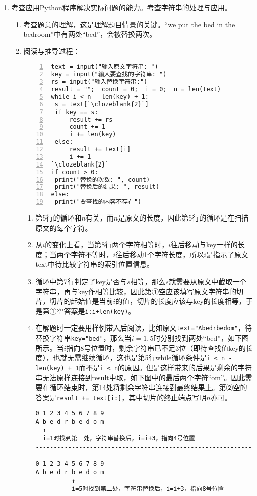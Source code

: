 \begin{enumerate}
\item 考查应用Python程序解决实际问题的能力。考查字符串的处理与应用。
	\begin{enumerate}[label=$(\arabic*)$]
	\item 考查题意的理解，这是理解题目情景的关键。“we put the bed in the bedroom”中有两处“bed”，会被替换两次。	
	\item 阅读与推导过程：
\setcounter{qnumber}{1}
\begin{lstlisting}[numbers=left]
text = input("输入原文字符串: ")
key = input("输入要查找的字符串: ")
rs = input("输入替换字符串:")
result = "";  count = 0;  i = 0;  n = len(text)
while i < n - len(key) + 1:
 s = text[`\clozeblank{2}`]
 if key == s:
     result += rs
     count += 1
     i += len(key)
 else:
     result += text[i]
     i += 1
`\clozeblank{2}`
if count > 0:
 print("替换的次数: ", count)
 print("替换后的结果: ", result)
else:
 print("要查找的内容不存在")
\end{lstlisting}
		\begin{enumerate}[label=$(\alph*)$]
		\item 第5行的循环和$n$有关，而$n$是原文的长度，因此第5行的循环是在扫描原文的每个字符。
		\item 从$i$的变化上看，当第8行两个字符相等时，$i$往后移动与key一样的长度；当两个字符不等时，$i$往后移动1个字符长度，所以$i$是指示了原文text中待比较字符串的索引位置信息。
		\item 循环中第7行判定了key是否与$s$相等，那么$s$就需要从原文中截取一个字符串，再与key作相等比较，因此第①空应该填写原文字符串的切片，切片的起始值是当前$i$的值，切片的长度应该与key的长度相等，于是第①空答案是\lstinline|i:i+len(key)|。
		\item 在解题时一定要用样例带入后阅读，比如原文\lstinline|text="Abedrbedom"|，待替换字符串\lstinline|key="bed"|，那么当$i=1,5$时分别找到两处“bed”，如下图所示。当$i$指向8号位置时，剩余字符串已不足3位（即待查找值key的长度），也就无需继续循环，这也是第5行while循环条件是\lstinline|i < n - len(key) + 1|而不是\lstinline|i < n|的原因。但是这样带来的后果是剩余的字符串无法原样连接到result中取，如下图中的最后两个字符“om”。因此需要在循环结束时，第14处将剩余字符串连接到最终结果上。第②空的答案是\lstinline|result += text[i:]|，其中切片的终止端点写明$n$亦可。
\begin{lstlisting}
0 1 2 3 4 5 6 7 8 9
A b e d r b e d o m
  ↑
  i=1时找到第一处，字符串替换后，i=i+3，指向4号位置
----------------------------------------------------------------------
0 1 2 3 4 5 6 7 8 9
A b e d r b e d o m
          ↑
          i=5时找到第二处，字符串替换后，i=i+3，指向8号位置
\end{lstlisting}
		\end{enumerate}
	

	\end{enumerate}

\end{enumerate}



